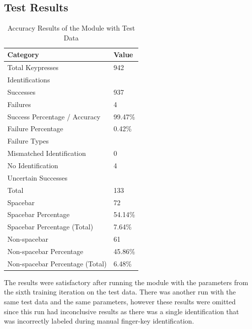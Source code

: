 \documentclass{report}
\begin{document}
\subsection{Test Results}
\begin{table}[H]
	\small
	\centering
	\begin{tabular}{ p{} R{0.2\textwidth} }
		\toprule
		Category                        & Value   \\
		\midrule
		Total Keypresses                & 942     \\[0.25cm]
		\midrule
		Identifications                           \\
		\midrule
		Successes                       & 937     \\
		Failures                        & 4       \\
		Success Percentage / Accuracy   & 99.47\% \\
		Failure Percentage              & 0.42\%  \\[0.25cm]
		\midrule
		Failure Types                             \\
		\midrule
		Mismatched Identification       & 0       \\
		No Identification               & 4       \\[0.25cm]
		\midrule
		Uncertain Successes                       \\
		\midrule
		Total                           & 133     \\
		Spacebar                        & 72      \\
		Spacebar Percentage             & 54.14\% \\
		Spacebar Percentage (Total)     & 7.64\%  \\
		Non-spacebar                    & 61      \\
		Non-spacebar Percentage         & 45.86\% \\
		Non-spacebar Percentage (Total) & 6.48\%  \\
		\bottomrule
	\end{tabular}
	\caption{\label{tab:rd-accuracy}Accuracy Results of the Module with Test Data}
\end{table}

The results were satisfactory after running the module with the parameters from
the sixth training iteration on the test data. There was another run with the
same test data and the same parameters, however these results were omitted since
this run had inconclusive results as there was a single identification that was
incorrectly labeled during manual finger-key identification.
\end{document}
